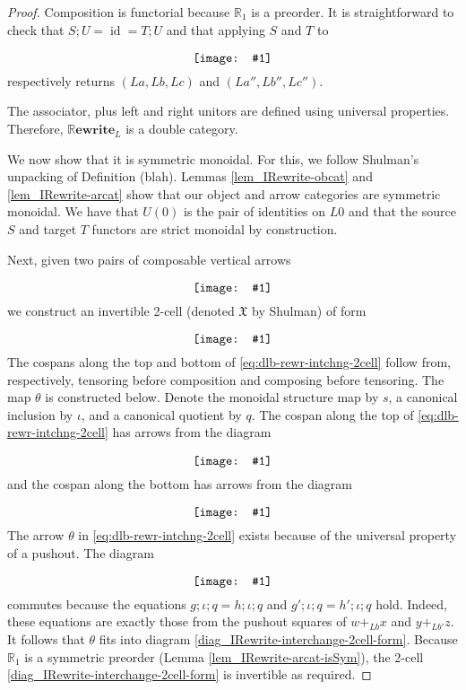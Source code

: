 \documentclass{amsart}
\newcommand{\RR}{\mathbb{R}}
\newcommand{\diagram}[1]{\raisebox{-0.5\height}{\texttt{[image: \#1]}}}
\newcommand{\RRewrite}{ \mathbb{R}\mathbf{ewrite} }
\newcommand{\edit}[1]{\textcolor{editcolour}{(#1)}}
\DeclareMathOperator{\id}{id}
\theoremstyle{remark}
\theoremstyle{definition}
\begin{document}
\begin{proof}
  
  Composition is functorial because $ \RR_1 $ is a preorder. It is
  straightforward to check that $ S;U = \id = T;U$ and that applying
  $ S $ and $ T $ to
  \[
    \diagram{diag_nlr_dbl-rewrite-deconstructed-composite}
  \]
  respectively returns \( ( La , Lb , Lc ) \) and \( ( La'' , Lb'' , Lc'' ) \). 
  
  The associator, plus left and right unitors are defined using
  universal properties. Therefore, $ \RRewrite_L $ is a double
  category.
	
  We now show that it is symmetric monoidal.  For this, we follow
  Shulman's unpacking of Definition \edit{blah}.  
  Lemmas \ref{lem_IRewrite-obcat} and \ref{lem_IRewrite-arcat} show
  that our object and arrow categories are symmetric monoidal.  We
  have that $ U ( 0 ) $ is the pair of identities on $ L 0 $ and that
  the source $ S $ and target $ T $ functors are strict monoidal by
  construction.
	
  Next, given two pairs of composable vertical arrows
  \[
    \diagram{diag_nlr_dbl-rewrite-interchange}
  \]
  we construct an invertible 2-cell (denoted $ \mathfrak{X} $ by
  Shulman) of form
  \begin{equation} \label{eq:dlb-rewr-intchng-2cell}
    \diagram{diag_nlr_dbl-rewrite-interchange-2cell}
  \end{equation}
  The cospans along the top and bottom of
  \eqref{eq:dlb-rewr-intchng-2cell} follow from, respectively,
  tensoring before composition and composing before tensoring. The map
  $ \theta $ is constructed below. Denote the monoidal structure map
  by $ s $, a canonical inclusion by $ \iota $, and a canonical
  quotient by $ q $.  The cospan along the top of
  \eqref{eq:dlb-rewr-intchng-2cell} has arrows from the diagram
  \[
    \diagram{diag_nlr_dbl-rewrite-tensor-compose}
  \]
  and the cospan along the bottom has arrows from the diagram
  \[
    \diagram{diag_nlr_dbl-rewrite-compose-tensor}
  \]
  The arrow $ \theta $ in \eqref{eq:dlb-rewr-intchng-2cell} exists
  because of the universal property of a pushout.  The diagram
  \[
    \diagram{diag_nlr_dbl-rewrite-pushout-competetor}
  \]
  commutes because the equations $ g ; \iota ; q = h ; \iota ; q $ and
  $ g' ; \iota ; q = h' ; \iota ; q $ hold.  Indeed, these equations
  are exactly those from the pushout squares of $ w +_{Lb} x $ and
  $ y +_{Lb'} z $.  It follows that $ \theta $ fits into diagram
  \eqref{diag_IRewrite-interchange-2cell-form}. Because $ \RR_1 $ is a
  symmetric preorder (Lemma \ref{lem_IRewrite-arcat-isSym}), the
  2-cell \eqref{diag_IRewrite-interchange-2cell-form} is invertible as
  required.
	

\end{proof}
\end{document}
